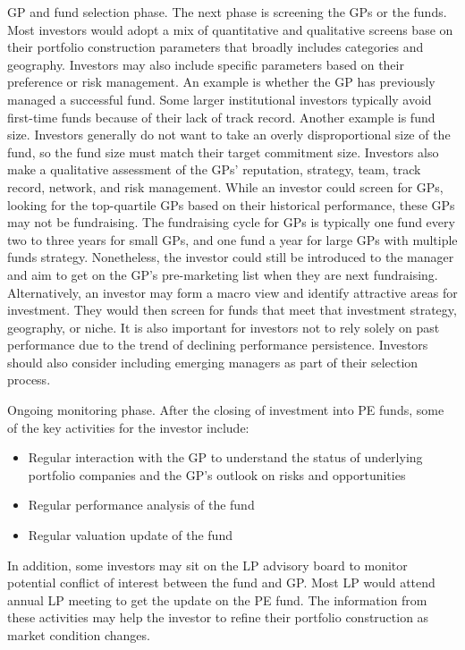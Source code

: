 \documentclass[11pt]{article}
\begin{document}
GP and fund selection phase. The next phase is screening the GPs or the funds. Most investors would adopt a mix of quantitative and qualitative screens base on their portfolio construction parameters that broadly includes categories and geography. Investors may also include specific parameters based on their preference or risk management. An example is whether the GP has previously managed a successful fund. Some larger institutional investors typically avoid first-time funds because of their lack of track record. Another example is fund size. Investors generally do not want to take an overly disproportional size of the fund, so the fund size must match their target commitment size. Investors also make a qualitative assessment of the GPs' reputation, strategy, team, track record, network, and risk management. While an investor could screen for GPs, looking for the top-quartile GPs based on their historical performance, these GPs may not be fundraising. The fundraising cycle for GPs is typically one fund every two to three years for small GPs, and one fund a year for large GPs with multiple funds strategy. Nonetheless, the investor could still be introduced to the manager and aim to get on the GP's pre-marketing list when they are next fundraising. Alternatively, an investor may form a macro view and identify attractive areas for investment. They would then screen for funds that meet that investment strategy, geography, or niche. It is also important for investors not to rely solely on past performance due to the trend of declining performance persistence. Investors should also consider including emerging managers as part of their selection process.

Ongoing monitoring phase. After the closing of investment into PE funds, some of the key activities for the investor include:

\begin{itemize}
  \item Regular interaction with the GP to understand the status of underlying portfolio companies and the GP's outlook on risks and opportunities
  \item Regular performance analysis of the fund
  \item Regular valuation update of the fund
\end{itemize}

In addition, some investors may sit on the LP advisory board to monitor potential conflict of interest between the fund and GP. Most LP would attend annual LP meeting to get the update on the PE fund. The information from these activities may help the investor to refine their portfolio construction as market condition changes.
\end{document}
